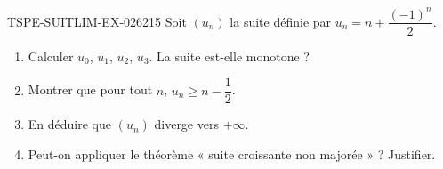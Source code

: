 \begin{exercice}{TSPE-SUITLIM-EX-026}{2}{15}
Soit $(u_n)$ la suite définie par $u_n = n + \dfrac{(-1)^n}{2}$.
\begin{enumerate}
  \item Calculer $u_0$, $u_1$, $u_2$, $u_3$. La suite est-elle monotone ?
  \item Montrer que pour tout $n$, $u_n \geq n - \dfrac{1}{2}$.
  \item En déduire que $(u_n)$ diverge vers $+\infty$.
  \item Peut-on appliquer le théorème « suite croissante non majorée » ? Justifier.
\end{enumerate}
\end{exercice}
